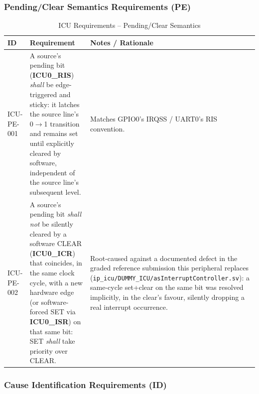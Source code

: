 \subsubsection{Pending/Clear Semantics Requirements (PE)}

\begin{table}[H]
\caption{ICU Requirements -- Pending/Clear Semantics}
\label{tab:asIcuReqPE}
\centering
\begin{tabularx}{\textwidth}{|l |X |X|}
  \hline
  ID & Requirement & Notes / Rationale \\
  \hline
  \hline
  ICU-PE-001 &
    A source's pending bit (\textbf{ICU0\_RIS}) \textit{shall} be
    edge-triggered and sticky: it latches the source line's 0$\to$1
    transition and remains set until explicitly cleared by software,
    independent of the source line's subsequent level. &
    Matches GPIO0's IRQSS / UART0's RIS convention. \\
  \hline
  ICU-PE-002 &
    A source's pending bit \textit{shall not} be silently cleared by a
    software CLEAR (\textbf{ICU0\_ICR}) that coincides, in the same clock
    cycle, with a new hardware edge (or software-forced SET via
    \textbf{ICU0\_ISR}) on that same bit: SET \textit{shall} take priority
    over CLEAR. &
    Root-caused against a documented defect in the graded reference
    submission this peripheral replaces
    (\texttt{ip\_icu/DUMMY\_ICU/asInterruptController.sv}): a same-cycle
    set+clear on the same bit was resolved implicitly, in the clear's
    favour, silently dropping a real interrupt occurrence. \\
  \hline
\end{tabularx}
\end{table}

\subsubsection{Cause Identification Requirements (ID)}

